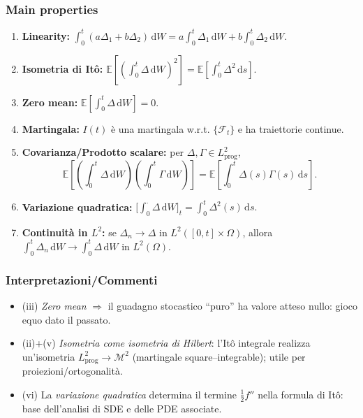 \documentclass[12pt,a4paper]{book}
\theoremstyle{remark}
\newcommand{\EE}{\mathbb{E}}          %
\newcommand{\F}{\mathcal{F}}          %
\newcommand{\dd}{\mathrm{d}}
\begin{document}
\subsubsection*{Main properties}
\begin{enumerate}[label=\roman*)]
\item \textbf{Linearity:} $\displaystyle \int_0^t (a\Delta_1+b\Delta_2)\,\dd W = a\int_0^t \Delta_1\,\dd W + b\int_0^t \Delta_2\,\dd W.$
\item \textbf{Isometria di It\^o:} $\displaystyle \EE\!\left[\left(\int_0^t \Delta\,\dd W\right)^2\right]=\EE\!\left[\int_0^t \Delta^2\,\dd s\right].$
\item \textbf{Zero mean:} $\displaystyle \EE\!\left[\int_0^t \Delta\,\dd W\right]=0.$
\item \textbf{Martingala:} $I(t)$ è una martingala w.r.t. $\{\F_t\}$ e ha traiettorie continue.
\item \textbf{Covarianza/Prodotto scalare:} per $\Delta,\Gamma\in L^2_{\text{prog}}$,
\[
\EE\!\left[\left(\int_0^t \Delta\,\dd W\right)\!\left(\int_0^t \Gamma\,\dd W\right)\right]
=\EE\!\left[\int_0^t \Delta(s)\Gamma(s)\,\dd s\right].
\]
\item \textbf{Variazione quadratica:} $\displaystyle \big[\textstyle\int_0^\cdot \Delta\,\dd W\big]_t=\int_0^t \Delta^2(s)\,\dd s.$
\item \textbf{Continuit\`a in $L^2$:} se $\Delta_n\to\Delta$ in $L^2([0,t]\times\Omega)$, allora $\int_0^t \Delta_n\,\dd W \to \int_0^t \Delta\,\dd W$ in $L^2(\Omega)$.
\end{enumerate}

\subsubsection*{Interpretazioni/Commenti}
\begin{itemize}
\item (iii) \emph{Zero mean} $\Rightarrow$ il guadagno stocastico “puro” ha valore atteso nullo: gioco equo dato il passato.
\item (ii)+(v) \emph{Isometria come isometria di Hilbert}: l’It\^o integrale realizza un’isometria $L^2_{\text{prog}} \to \mathcal{M}^2$ (martingale square–integrable); utile per proiezioni/ortogonalit\`a.
\item (vi) La \emph{variazione quadratica} determina il termine $\tfrac12 f''$ nella formula di It\^o: base dell’analisi di SDE e delle PDE associate.
\end{itemize}
\end{document}
